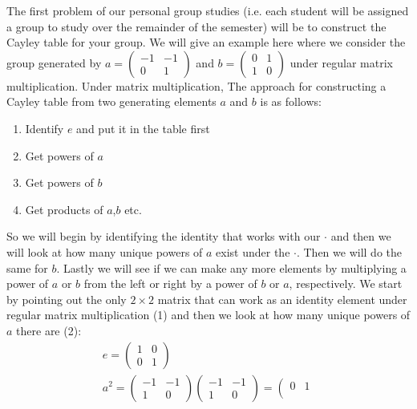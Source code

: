\begin{example}
\noindent The first problem of our personal group studies (i.e. each student will be assigned a group to study over the remainder of the semester) will be to construct the Cayley table for your group. We will give an example here where we consider the group generated by $a=\left(\begin{matrix}
-1 & -1 \\
0 & 1 
\end{matrix}\right)$ and $b=\left(\begin{matrix}
0 & 1 \\
1 & 0 
\end{matrix}\right)$ under regular matrix multiplication. Under matrix multiplication, 
The approach for constructing a Cayley table from two generating elements $a$ and $b$ is as follows:
\begin{enumerate}
    \item Identify $e$ and put it in the table first
    \item Get powers of $a$
    \item Get powers of $b$
    \item Get products of $a$,$b$ etc.
\end{enumerate}
So we will begin by identifying the identity that works with our $\cdot$ and then we will look at how many unique powers of $a$ exist under the $\cdot$. Then we will do the same for $b$. Lastly we will see if we can make any more elements by multiplying a power of $a$ or $b$ from the left or right by a power of $b$ or $a$, respectively. We start by pointing out the only $2\times 2$ matrix that can work as an identity element under regular matrix multiplication (1) and then we look at how many unique powers of $a$ there are (2):
\begin{align}
    e =\left(\begin{matrix}
1 & 0 \\
0 & 1 
\end{matrix}\right)\nonumber \\
a^2=\left(\begin{matrix}
-1 & -1 \\
1 & 0 
\end{matrix}\right)\left(\begin{matrix}
-1 & -1 \\
1 & 0 
\end{matrix}\right)=\left(\begin{matrix}
0 & 1 \\

\end{matrix}
\end{align}
\end{example}
